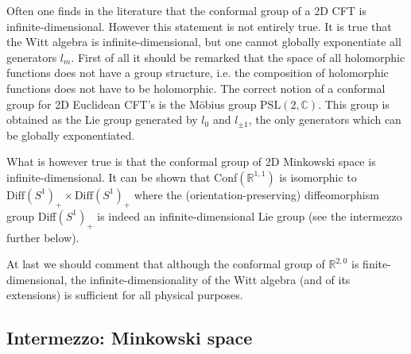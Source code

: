 	
	\begin{remark}
		Often one finds in the literature that the conformal group of a 2D CFT is infinite-dimensional. However this statement is not entirely true. It is true that the Witt algebra is infinite-dimensional, but one cannot globally exponentiate all generators $l_m$. First of all it should be remarked that the space of all holomorphic functions does not have a group structure, i.e. the composition of holomorphic functions does not have to be holomorphic. The correct notion of a conformal group for 2D Euclidean CFT's is the M\"obius group PSL$(2, \mathbb{C})$. This group is obtained as the Lie group generated by $l_0$ and $l_{\pm1}$, the only generators which can be globally exponentiated.
		
		What is however true is that the conformal group of 2D Minkowski space is infinite-dimensional. It can be shown that Conf$(\mathbb{R}^{1, 1})$ is isomorphic to $\text{Diff}(S^1)_+\times\text{Diff}(S^1)_+$ where the (orientation-preserving) diffeomorphism group Diff$(S^1)_+$ is indeed an infinite-dimensional Lie group (see the intermezzo further below).
		
		At last we should comment that although the conformal group of $\mathbb{R}^{2, 0}$ is finite-dimensional, the infinite-dimensionality of the Witt algebra (and of its extensions) is sufficient for all physical purposes.
	\end{remark}
	

\subsection{Intermezzo: Minkowski space}

